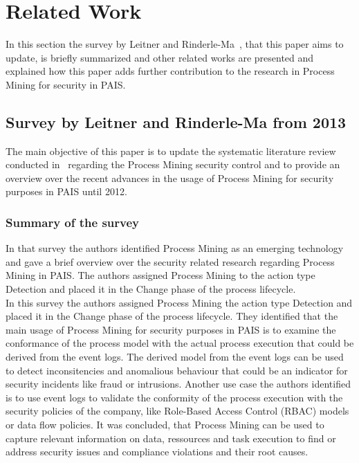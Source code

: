 \documentclass[runningheads]{llncs}
\begin{document}
\section{Related Work}\label{Related}
In this section the survey by Leitner and Rinderle-Ma~\cite{Leitner2014273}, that this paper aims to update, is briefly summarized and other related works are presented and explained how
this paper adds further contribution to the research in Process Mining for security in PAIS.\\
\subsection{Survey by Leitner and Rinderle-Ma from 2013}\label{basepaper}
The main objective of this paper is to update the systematic literature review conducted in~\cite{Leitner2014273} regarding the Process Mining security control and to provide an overview over the recent advances
in the usage of Process Mining for security purposes in PAIS until 2012.
\subsubsection{Summary of the survey}\label{Summary}
In that survey the authors identified Process Mining as an emerging technology and gave a brief overview
over the security related research regarding Process Mining in PAIS\@. The authors assigned Process Mining to the action type Detection and placed it in the Change phase of the
process lifecycle.\\
In this survey the authors assigned Process Mining the action type Detection and placed it in the Change phase of the process lifecycle. They identified that the main usage of
Process Mining for security purposes in PAIS is to examine the conformance of the process model with the actual process execution that could be derived from the event logs.
The derived model from the event logs can be used to detect inconsitencies and anomalious behaviour that could be an indicator for security incidents like fraud or intrusions.
Another use case the authors identified is to use event logs to validate the conformity of the process execution with the security policies of the company, like
Role-Based Access Control (RBAC) models or data flow
policies. It was concluded, that Process Mining can be used to capture relevant information on data, ressources and task execution to find or address security issues and compliance
violations and their root causes.\\
\end{document}
